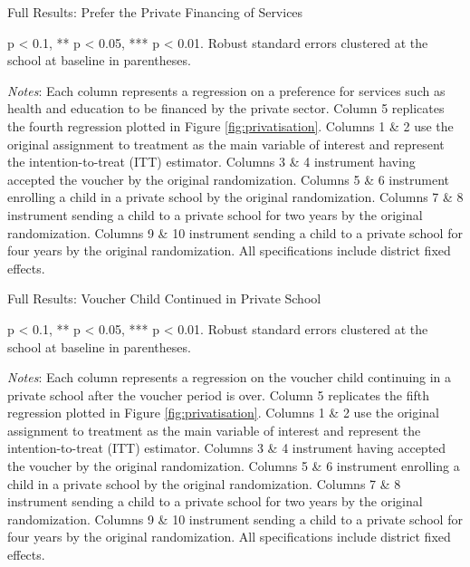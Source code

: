 \documentclass[hidelinks, 12pt, titlepage]{article}
\begin{document}
\begin{landscape}
				\begin{table}
					\begin{threeparttable}
						\centering
						\caption{Full Results: Prefer the Private Financing of Services\label{table:appendixprivateservicefinancing}}
						
						\begin{tablenotes}
							\item * p < 0.1, ** p < 0.05, *** p < 0.01. Robust standard errors clustered at the school at baseline in parentheses.
							\item \emph{Notes}: Each column represents a regression on a preference for services such as health and education to be financed by the private sector.  Column 5 replicates the fourth regression plotted in Figure \ref{fig:privatisation}.  Columns 1 \& 2 use the original assignment to treatment as the main variable of interest and represent the intention-to-treat (ITT) estimator.  Columns 3 \& 4 instrument having accepted the voucher by the original randomization.  Columns 5 \& 6 instrument enrolling a child in a private school by the original randomization.  Columns 7 \& 8 instrument sending a child to a private school for two years by the original randomization.  Columns 9 \& 10 instrument sending a child to a private school for four years by the original randomization.  All specifications include district fixed effects.
						\end{tablenotes}
					\end{threeparttable}
				\end{table}
				\clearpage

				\begin{table}
					\begin{threeparttable}
						\centering
						\caption{Full Results: Voucher Child Continued in Private School\label{table:appendixprivateschool}}
						
						\begin{tablenotes}
							\item * p < 0.1, ** p < 0.05, *** p < 0.01. Robust standard errors clustered at the school at baseline in parentheses.
							\item \emph{Notes}: Each column represents a regression on the voucher child continuing in a private school after the voucher period is over.  Column 5 replicates the fifth regression plotted in Figure \ref{fig:privatisation}.  Columns 1 \& 2 use the original assignment to treatment as the main variable of interest and represent the intention-to-treat (ITT) estimator.  Columns 3 \& 4 instrument having accepted the voucher by the original randomization.  Columns 5 \& 6 instrument enrolling a child in a private school by the original randomization.  Columns 7 \& 8 instrument sending a child to a private school for two years by the original randomization.  Columns 9 \& 10 instrument sending a child to a private school for four years by the original randomization.  All specifications include district fixed effects.
						\end{tablenotes}
					\end{threeparttable}
				\end{table}
				\clearpage


\end{landscape}
\end{document}
